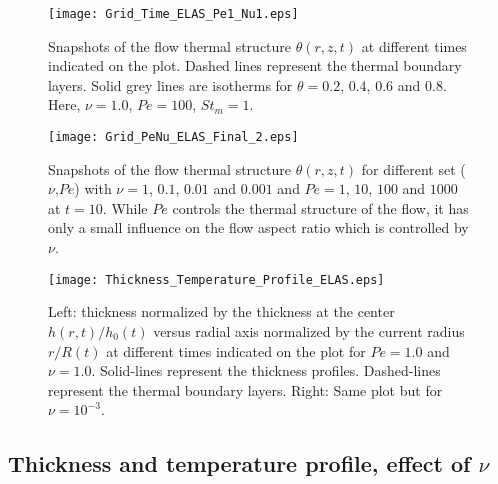 \begin{figure}
  \begin{center}
    \graphicspath{ {/Users/thorey/Documents/These/Projet/Refroidissement/Skin_Model/Figure/JFM_V13/} }
    \texttt{[image: Grid\_Time\_ELAS\_Pe1\_Nu1.eps]}
    \caption{Snapshots of  the flow thermal  structure $\theta(r,z,t)$
      at  different  times  indicated   on  the  plot.   Dashed  lines
      represent  the thermal  boundary  layers. Solid  grey lines  are
      isotherms for  $\theta =  0.2$, $0.4$,  $0.6$ and  $0.8$.  Here,
      $\nu=1.0$, $Pe =100$, $St_m = 1$.}
    \label{C3-Grid_Time_ELAS}
  \end{center}
\end{figure}

\begin{figure}
  \begin{center}
    \graphicspath{ {/Users/thorey/Documents/These/Projet/Refroidissement/Skin_Model/Figure/JFM_V13/} }
    \texttt{[image: Grid\_PeNu\_ELAS\_Final\_2.eps]}
    \caption{Snapshots of  the flow thermal  structure $\theta(r,z,t)$
      for different set ($\nu$,$Pe$) with  $\nu= 1$, $0.1$, $0.01$ and
      $0.001$ and  $Pe=1$, $10$,  $100$ and  $1000$ at  $t=10$.  While
      $Pe$ controls the  thermal structure of the flow, it  has only a
      small influence on the flow  aspect ratio which is controlled by
      $\nu$.}
    \label{C3-Grid_PeNu_ELAS}
  \end{center}
\end{figure}

\begin{figure}
  \begin{center}
    \graphicspath{ {/Users/thorey/Documents/These/Projet/Refroidissement/Skin_Model/Figure/JFM_V13/} }
    \texttt{[image: Thickness\_Temperature\_Profile\_ELAS.eps]}
    \caption{Left: thickness normalized by the thickness at the center
      $h(r,t)/h_0(t)$  versus radial  axis normalized  by the  current
      radius $r/R(t)$  at different  times indicated  on the  plot for
      $Pe=1.0$  and $\nu=1.0$.   Solid-lines  represent the  thickness
      profiles.  Dashed-lines  represent the thermal  boundary layers.
      Right: Same plot but for $\nu=10^{-3}$.}
    \label{C3-Thickness_Temperature_Profile_ELAS}
  \end{center}
\end{figure}



\subsection{Thickness and temperature profile, effect of $\nu$}
\label{C3-sec:thickn-temp-prof-1-e}

